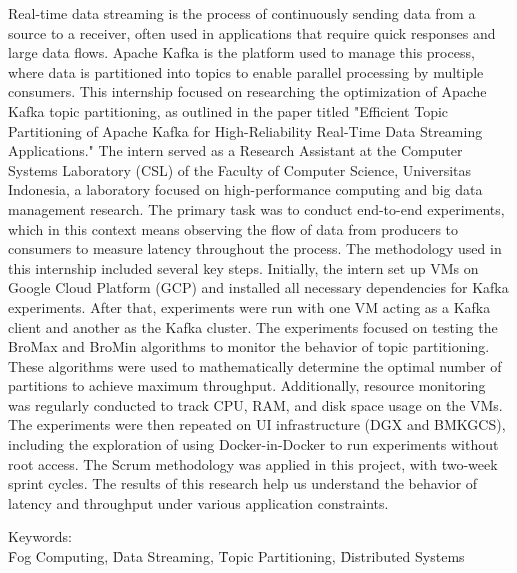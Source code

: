 \noindent Real-time data streaming is the process of continuously sending data from a source to a receiver, often used in applications that require quick responses and large data flows. Apache Kafka is the platform used to manage this process, where data is partitioned into topics to enable parallel processing by multiple consumers. This internship focused on researching the optimization of Apache Kafka topic partitioning, as outlined in the paper titled "Efficient Topic Partitioning of Apache Kafka for High-Reliability Real-Time Data Streaming Applications." The intern served as a Research Assistant at the Computer Systems Laboratory (CSL) of the Faculty of Computer Science, Universitas Indonesia, a laboratory focused on high-performance computing and big data management research. The primary task was to conduct end-to-end experiments, which in this context means observing the flow of data from producers to consumers to measure latency throughout the process. The methodology used in this internship included several key steps. Initially, the intern set up VMs on Google Cloud Platform (GCP) and installed all necessary dependencies for Kafka experiments. After that, experiments were run with one VM acting as a Kafka client and another as the Kafka cluster. The experiments focused on testing the BroMax and BroMin algorithms to monitor the behavior of topic partitioning. These algorithms were used to mathematically determine the optimal number of partitions to achieve maximum throughput. Additionally, resource monitoring was regularly conducted to track CPU, RAM, and disk space usage on the VMs. The experiments were then repeated on UI infrastructure (DGX and BMKGCS), including the exploration of using Docker-in-Docker to run experiments without root access. The Scrum methodology was applied in this project, with two-week sprint cycles. The results of this research help us understand the behavior of latency and throughput under various application constraints. \\

\vspace*{0.2cm}

\noindent Keywords: \\ \f{Fog Computing}, \f{Data Streaming}, \f{Topic Partitioning}, \f{Distributed Systems} \\

\newpage
